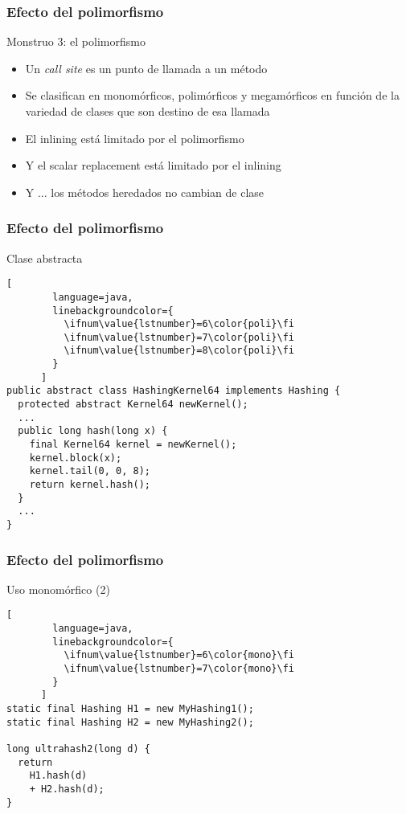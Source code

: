 
\def\ft{Efecto del polimorfismo}

\begin{frame}[fragile]
  \frametitle{\ft}
  \begin{block}{Monstruo 3: el polimorfismo}
    \begin{itemize}
    \item Un {\it call site} es un punto de llamada a un método
    \item Se clasifican en monomórficos, polimórficos y megamórficos
      en función de la variedad de clases que son destino de esa llamada
    \item El inlining está limitado por el polimorfismo
    \item Y el scalar replacement está limitado por el inlining
    \item Y ... los métodos heredados no cambian de clase
    \end{itemize}
  \end{block}
\end{frame}


\begin{frame}[fragile]
  \frametitle{\ft}
  \begin{block}{Clase abstracta}
    \begin{lstlisting}[
        language=java,
        linebackgroundcolor={
          \ifnum\value{lstnumber}=6\color{poli}\fi
          \ifnum\value{lstnumber}=7\color{poli}\fi
          \ifnum\value{lstnumber}=8\color{poli}\fi
        }
      ]
public abstract class HashingKernel64 implements Hashing {
  protected abstract Kernel64 newKernel();
  ...
  public long hash(long x) {
    final Kernel64 kernel = newKernel();
    kernel.block(x);
    kernel.tail(0, 0, 8);
    return kernel.hash();
  }
  ...
}
    \end{lstlisting}
  \end{block}
\end{frame}


\begin{frame}[fragile]
  \frametitle{\ft}
  \begin{block}{Uso monomórfico (2)}
    \begin{lstlisting}[
        language=java,
        linebackgroundcolor={
          \ifnum\value{lstnumber}=6\color{mono}\fi
          \ifnum\value{lstnumber}=7\color{mono}\fi
        }
      ]
static final Hashing H1 = new MyHashing1();
static final Hashing H2 = new MyHashing2();

long ultrahash2(long d) {
  return
    H1.hash(d)
    + H2.hash(d);
}
    \end{lstlisting}
  \end{block}
\end{frame}


